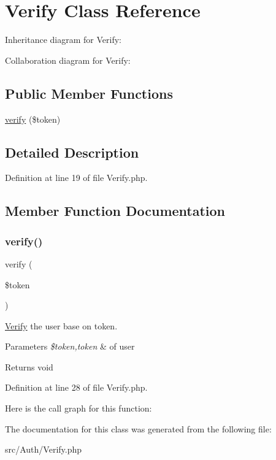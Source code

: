 \hypertarget{class_zest_1_1_auth_1_1_verify}{}\section{Verify Class Reference}
\label{class_zest_1_1_auth_1_1_verify}


Inheritance diagram for Verify\+:


Collaboration diagram for Verify\+:
\subsection*{Public Member Functions}
\begin{DoxyCompactItemize}
\item 
\mbox{\hyperlink{class_zest_1_1_auth_1_1_verify_a6b55dfbe4680d05296400f995e1e3b99}{verify}} (\$token)
\end{DoxyCompactItemize}


\subsection{Detailed Description}


Definition at line 19 of file Verify.\+php.



\subsection{Member Function Documentation}
\mbox{\label{class_zest_1_1_auth_1_1_verify_a6b55dfbe4680d05296400f995e1e3b99}} 
\subsubsection{\texorpdfstring{verify()}{verify()}}
{\footnotesize\ttfamily verify (\begin{DoxyParamCaption}\item[{}]{\$token }\end{DoxyParamCaption})}

\mbox{\hyperlink{class_zest_1_1_auth_1_1_verify}{Verify}} the user base on token.


\begin{DoxyParams}{Parameters}
{\em \$token,token} & of user\\
\hline
\end{DoxyParams}
\begin{DoxyReturn}{Returns}
void 
\end{DoxyReturn}


Definition at line 28 of file Verify.\+php.

Here is the call graph for this function\+:


The documentation for this class was generated from the following file\+:\begin{DoxyCompactItemize}
\item 
src/\+Auth/Verify.\+php\end{DoxyCompactItemize}
